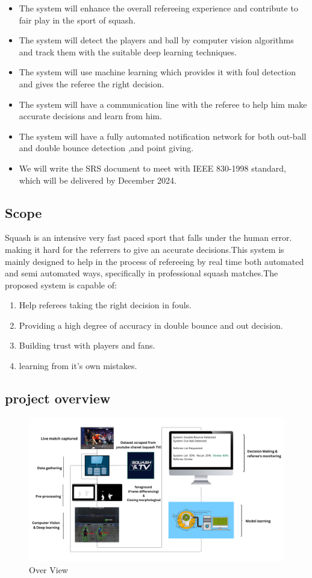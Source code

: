 \documentclass[12pt]{article}
\begin{document}
\begin{itemize}
    \item  The system will enhance the overall refereeing experience and contribute to fair play in the sport of squash.
    \item The system will detect the players and ball by computer vision algorithms and track them with the suitable deep learning techniques.
    \item The system will use machine learning which provides it with foul detection and gives the referee the right decision. 
    \item The system will have a communication line with the referee to help him make accurate decisions and learn from him.
    \item The system will have a fully automated notification network for both out-ball and double bounce detection ,and point giving.
    \item We will write the SRS document to meet with IEEE 830-1998 standard, which will be delivered by December 2024.
\end{itemize}

\subsection{Scope}
Squash is an intensive very fast paced sport that falls under the human error. making it hard for the referrers to give an accurate decisions.This system is mainly designed to help in the process of refereeing by real time both automated and semi automated ways, specifically in professional squash matches.The proposed system is capable of:
\begin{enumerate}
    \item Help referees taking the right decision in fouls.
    \item Providing a high degree of accuracy in double bounce and out decision.
    \item Building trust with players and fans.
    \item learning from it's own mistakes.
\end{enumerate}

\subsection{project overview}
\begin{figure}[H]
    \centering
    \includegraphics[width=0.80\linewidth]{figures/system overview.png}
    \caption{Over View}
    \label{fig:OverView}
\end{figure}
\end{document}
